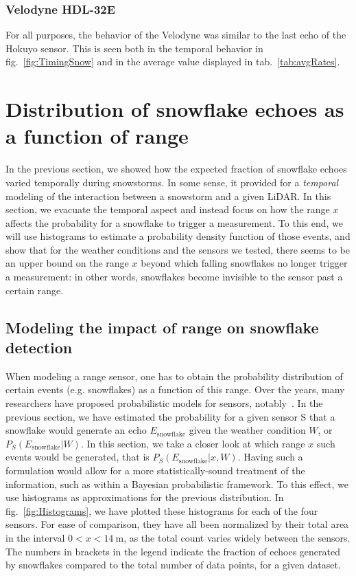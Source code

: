 \subsubsection{Velodyne HDL-32E}
For all purposes, the behavior of the Velodyne was similar to the last echo of the Hokuyo sensor. This is seen both in the temporal behavior in fig.~\ref{fig:TimingSnow} and in the average value displayed in tab.~\ref{tab:avgRates}.

\section{Distribution of snowflake echoes as a function of range}
\label{sec:Histo}

In the previous section, we showed how the expected fraction of snowflake echoes varied temporally during snowstorms. In some sense, it provided for a \emph{temporal} modeling of the interaction between a snowstorm and a given LiDAR. In this section, we evacuate the temporal aspect and instead focus on how the range $x$ affects the probability for a snowflake to trigger a measurement. To this end, we will use histograms to estimate a probability density function of those events, and show that for the weather conditions and the sensors we tested, there seems to be an upper bound on the range $x$ beyond which falling snowflakes no longer trigger a measurement: in other words, snowflakes become invisible to the sensor past a certain range.

\subsection{Modeling the impact of range on snowflake detection}
When modeling a range sensor, one has to obtain the probability distribution of certain events (e.g. snowflakes) as a function of this range. Over the years, many researchers have proposed probabilistic models for sensors, notably~\cite{Thrun:2005:PR:1121596}. In the previous section, we have estimated the probability for a given sensor S that a snowflake would generate an echo $E_\text{snowflake}$ given the weather condition $W$, or $P_S(E_\text{snowflake}|W)$. In this section, we take a closer look at which range $x$ such events would be generated, that is $P_S(E_\text{snowflake}|x,W)$. Having such a formulation would allow for a more statistically-sound treatment of the information, such as within a Bayesian probabilistic framework. To this effect, we use histograms as approximations for the previous distribution. In fig.~\ref{fig:Histograms}, we have plotted these histograms for each of the four sensors. For ease of comparison, they have all been normalized by their total area in the interval $0 < x < \SI{14}{\meter}$, as the total count varies widely between the sensors. The numbers in brackets in the legend indicate the fraction of echoes generated by snowflakes compared to the total number of data points, for a given dataset.

